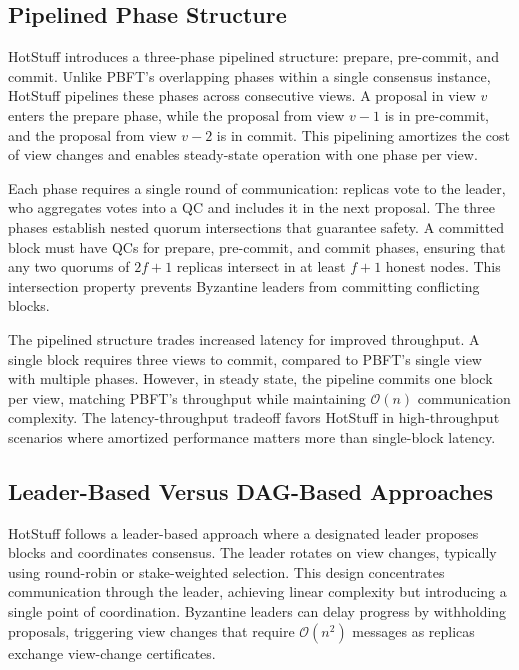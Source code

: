 \subsection{Pipelined Phase Structure}

HotStuff introduces a three-phase pipelined structure: prepare, pre-commit, and commit. Unlike PBFT's overlapping phases within a single consensus instance, HotStuff pipelines these phases across consecutive views. A proposal in view $v$ enters the prepare phase, while the proposal from view $v-1$ is in pre-commit, and the proposal from view $v-2$ is in commit. This pipelining amortizes the cost of view changes and enables steady-state operation with one phase per view.

Each phase requires a single round of communication: replicas vote to the leader, who aggregates votes into a QC and includes it in the next proposal. The three phases establish nested quorum intersections that guarantee safety. A committed block must have QCs for prepare, pre-commit, and commit phases, ensuring that any two quorums of $2f+1$ replicas intersect in at least $f+1$ honest nodes. This intersection property prevents Byzantine leaders from committing conflicting blocks.

The pipelined structure trades increased latency for improved throughput. A single block requires three views to commit, compared to PBFT's single view with multiple phases. However, in steady state, the pipeline commits one block per view, matching PBFT's throughput while maintaining $\mathcal{O}(n)$ communication complexity. The latency-throughput tradeoff favors HotStuff in high-throughput scenarios where amortized performance matters more than single-block latency.

\subsection{Leader-Based Versus DAG-Based Approaches}

HotStuff follows a leader-based approach where a designated leader proposes blocks and coordinates consensus. The leader rotates on view changes, typically using round-robin or stake-weighted selection. This design concentrates communication through the leader, achieving linear complexity but introducing a single point of coordination. Byzantine leaders can delay progress by withholding proposals, triggering view changes that require $\mathcal{O}(n^2)$ messages as replicas exchange view-change certificates.

